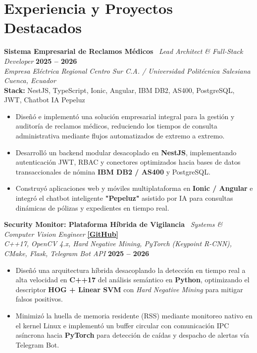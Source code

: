 \documentclass[9.5pt, letterpaper]{article}
\begin{document}
\section{Experiencia y Proyectos Destacados}

\noindent
\textbf{Sistema Empresarial de Reclamos Médicos} \textbar\ \textit{Lead Architect \& Full-Stack Developer} \hfill \textbf{2025 -- 2026}\\
\textit{Empresa Eléctrica Regional Centro Sur C.A. / Universidad Politécnica Salesiana} \hfill \textit{Cuenca, Ecuador}\\
\footnotesize\textbf{Stack:} NestJS, TypeScript, Ionic, Angular, IBM DB2, AS400, PostgreSQL, JWT, Chatbot IA Pepeluz
\begin{itemize}
    \item Diseñó e implementó una solución empresarial integral para la gestión y auditoría de reclamos médicos, reduciendo los tiempos de consulta administrativa mediante flujos automatizados de extremo a extremo.
    \item Desarrolló un backend modular desacoplado en \textbf{NestJS}, implementando autenticación JWT, RBAC y conectores optimizados hacia bases de datos transaccionales de nómina \textbf{IBM DB2 / AS400} y PostgreSQL.
    \item Construyó aplicaciones web y móviles multiplataforma en \textbf{Ionic / Angular} e integró el chatbot inteligente \textbf{"Pepeluz"} asistido por IA para consultas dinámicas de pólizas y expedientes en tiempo real.
\end{itemize}

\vspace{2.5pt}

\noindent
\textbf{Security Monitor: Plataforma Híbrida de Vigilancia} \textbar\ \textit{Systems \& Computer Vision Engineer} \hfill \href{https://github.com/David5Uzhca/Security_Monitor_Based_on_Computer_Vision}{\textbf{[GitHub]}}\\
\textit{C++17, OpenCV 4.x, Hard Negative Mining, PyTorch (Keypoint R-CNN), CMake, Flask, Telegram Bot API} \hfill \textbf{2025 -- 2026}
\begin{itemize}
    \item Diseñó una arquitectura híbrida desacoplando la detección en tiempo real a alta velocidad en \textbf{C++17} del análisis semántico en \textbf{Python}, optimizando el descriptor \textbf{HOG + Linear SVM} con \textit{Hard Negative Mining} para mitigar falsos positivos.
    \item Minimizó la huella de memoria residente (RSS) mediante monitoreo nativo en el kernel Linux e implementó un buffer circular con comunicación IPC asíncrona hacia \textbf{PyTorch} para detección de caídas y despacho de alertas vía Telegram Bot.
\end{itemize}
\end{document}
